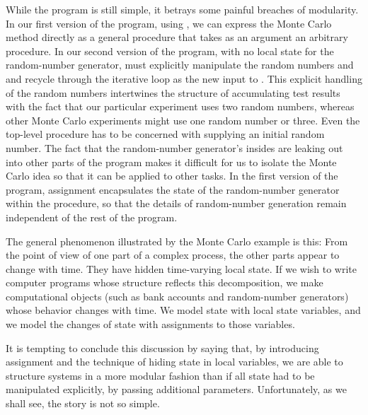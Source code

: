 \noindent
While the program is still simple, it betrays some painful breaches of
modularity.  In our first version of the program, using , we can
express the Monte Carlo method directly as a general 
procedure that takes as an argument an arbitrary  procedure.
In our second version of the program, with no local state for the random-number
generator,  must explicitly manipulate the random numbers
 and  and recycle  through the iterative loop as the
new input to .  This explicit handling of the random numbers
intertwines the structure of accumulating test results with the fact that our
particular experiment uses two random numbers, whereas other Monte Carlo
experiments might use one random number or three.  Even the top-level procedure
 has to be concerned with supplying an initial random number.
The fact that the random-number generator's insides are leaking out into other
parts of the program makes it difficult for us to isolate the Monte Carlo idea
so that it can be applied to other tasks.  In the first version of the program,
assignment encapsulates the state of the random-number generator within the
 procedure, so that the details of random-number generation remain
independent of the rest of the program.

The general phenomenon illustrated by the Monte Carlo example is this: From the
point of view of one part of a complex process, the other parts appear to
change with time.  They have hidden time-varying local state.  If we wish to
write computer programs whose structure reflects this decomposition, we make
computational objects (such as bank accounts and random-number generators)
whose behavior changes with time.  We model state with local state variables,
and we model the changes of state with assignments to those variables.

It is tempting to conclude this discussion by saying that, by introducing
assignment and the technique of hiding state in local variables, we are able to
structure systems in a more modular fashion than if all state had to be
manipulated explicitly, by passing additional parameters.  Unfortunately, as we
shall see, the story is not so simple.

